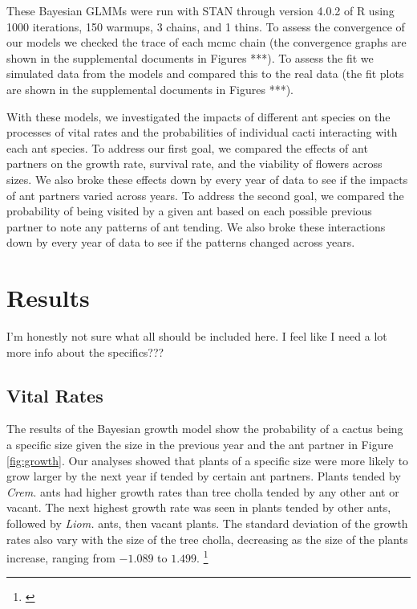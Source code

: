 \documentclass[12pt,a4paper]{article}
\newcommand{\ali}[2]{{\color{pink}{#1}}\footnote{\textit{\color{pink}{#2}}}}
\begin{document}
These Bayesian GLMMs were run with STAN through version 4.0.2  of R using 1000 iterations, 150 warmups, 3 chains, and 1 thins. 
To assess the convergence of our models we checked the trace of each mcmc chain (the convergence graphs are shown in the supplemental documents in Figures ***).
To assess the fit we simulated data from the models and compared this to the real data (the fit plots are shown in the supplemental documents in Figures ***).

With these models, we investigated the impacts of different ant species on the processes of vital rates and the probabilities of individual cacti interacting with each ant species.
To address our first goal, we compared the effects of ant partners on the growth rate, survival rate, and the viability of flowers across sizes. 
We also broke these effects down by every year of data to see if the impacts of ant partners varied across years. 
To address the second goal, we compared the probability of being visited by a given ant based on each possible previous partner to note any patterns of ant tending. 
We also broke these interactions down by every year of data to see if the patterns changed across years. 

\section*{Results}
I’m honestly not sure what all should be included here. I feel like I need a lot more info about the specifics???

\subsection*{Vital Rates}
The results of the Bayesian growth model show the probability of a cactus being a specific size given the size in the previous year and the ant partner in Figure \ref{fig:growth}.
Our analyses showed that plants of a specific size were more likely to grow larger by the next year if tended by certain ant partners. 
Plants tended by \textit{Crem.} ants had higher growth rates than tree cholla tended by any other ant or vacant. 
The next highest growth rate was seen in plants tended by other ants, followed by \textit{Liom.} ants, then vacant plants. 
The standard deviation of the growth rates also vary with the size of the tree cholla, decreasing as the size of the plants increase, ranging from $-1.089$ to $1.499$.
\ali{ }{I’m really unsure about what else I should say about this. }
\end{document}

